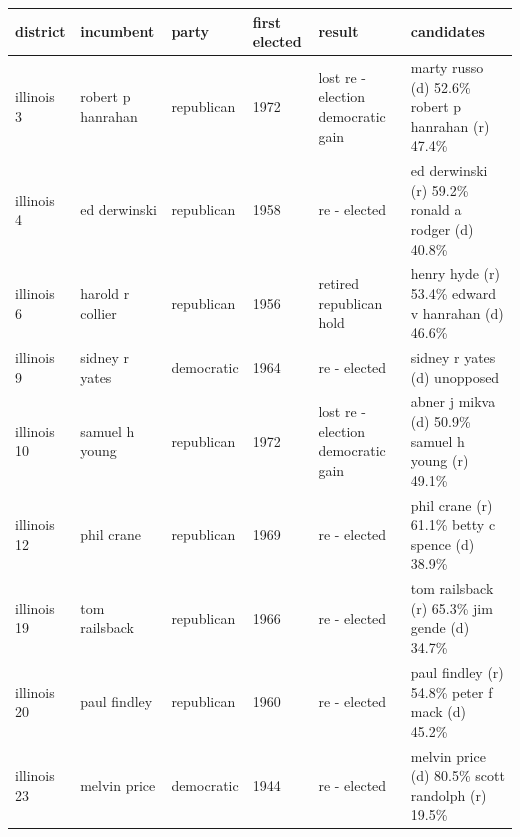 \documentclass{article}
\begin{document}
\begin{tabular}{llllll}
\toprule
district & incumbent & party & first elected & result & candidates \\
\midrule
illinois 3 & robert p hanrahan & republican & 1972 & lost re - election democratic gain & marty russo (d) 52.6\% robert p hanrahan (r) 47.4\% \\
illinois 4 & ed derwinski & republican & 1958 & re - elected & ed derwinski (r) 59.2\% ronald a rodger (d) 40.8\% \\
illinois 6 & harold r collier & republican & 1956 & retired republican hold & henry hyde (r) 53.4\% edward v hanrahan (d) 46.6\% \\
illinois 9 & sidney r yates & democratic & 1964 & re - elected & sidney r yates (d) unopposed \\
illinois 10 & samuel h young & republican & 1972 & lost re - election democratic gain & abner j mikva (d) 50.9\% samuel h young (r) 49.1\% \\
illinois 12 & phil crane & republican & 1969 & re - elected & phil crane (r) 61.1\% betty c spence (d) 38.9\% \\
illinois 19 & tom railsback & republican & 1966 & re - elected & tom railsback (r) 65.3\% jim gende (d) 34.7\% \\
illinois 20 & paul findley & republican & 1960 & re - elected & paul findley (r) 54.8\% peter f mack (d) 45.2\% \\
illinois 23 & melvin price & democratic & 1944 & re - elected & melvin price (d) 80.5\% scott randolph (r) 19.5\% \\
\bottomrule
\end{tabular}
\end{document}
